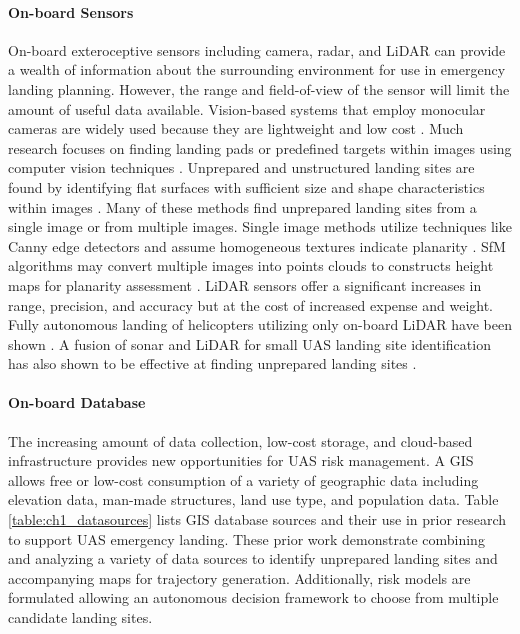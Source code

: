 \paragraph{On-board Sensors}

On-board exteroceptive sensors including camera, radar, and LiDAR can provide a wealth of information about the surrounding environment for use in emergency landing planning. However, the range and field-of-view of the sensor will limit the amount of useful data available. Vision-based systems that employ monocular cameras are widely used because they are lightweight and low cost \cite{jin_-board_2016}. Much research focuses on finding landing pads or predefined targets within images using computer vision techniques \cite{yang_autonomous_2014}. Unprepared and unstructured landing sites are found by identifying flat surfaces with sufficient size and shape characteristics within images \cite{warren_enabling_2015}. Many of these methods find unprepared landing sites from a single image or from multiple images. Single image methods utilize techniques like Canny edge detectors and assume homogeneous textures indicate planarity \cite{Wu2018, YuFeiShen2013}. \ac{SfM} algorithms may convert multiple images into points clouds to constructs height maps for planarity assessment \cite{forster_continuous_2015, desaraju_vision-based_2015}. LiDAR sensors offer a significant increases in range, precision, and accuracy but at the cost of increased expense and weight. Fully autonomous landing of helicopters utilizing only on-board LiDAR have been shown \cite{scherer_autonomous_2012, theodore_flight_2006}. A fusion of sonar and LiDAR for small UAS landing site identification has also shown to be effective at finding unprepared landing sites \cite{papa_uas_2018}. 



\paragraph{On-board Database}

The increasing amount of data collection, low-cost storage, and cloud-based infrastructure provides new opportunities for \ac{UAS} risk management. A \ac{GIS} allows free or low-cost consumption of a variety of geographic data including elevation data, man-made structures, land use type, and population data.  Table \ref{table:ch1_datasources} lists \ac{GIS} database sources and their use in prior research to support \ac{UAS} emergency landing. These prior work demonstrate combining and analyzing a variety of data sources to identify unprepared landing sites and accompanying maps for trajectory generation. Additionally, risk models are formulated allowing an autonomous decision framework to choose from multiple candidate landing sites.

